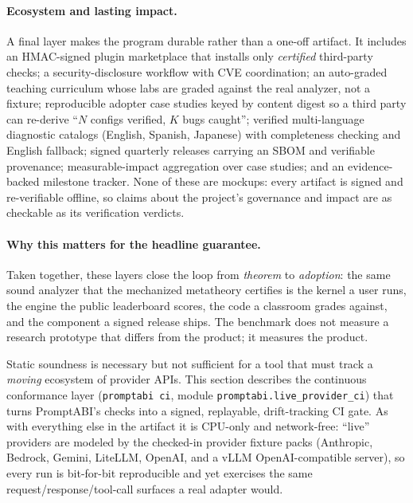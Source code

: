 \documentclass[10pt]{article}
\begin{document}
\paragraph{Ecosystem and lasting impact.}
A final layer makes the program durable rather than a one-off artifact. It
includes an HMAC-signed plugin marketplace that installs only \emph{certified}
third-party checks; a security-disclosure workflow with CVE coordination; an
auto-graded teaching curriculum whose labs are graded against the real analyzer,
not a fixture; reproducible adopter case studies keyed by content digest so a
third party can re-derive ``$N$ configs verified, $K$ bugs caught''; verified
multi-language diagnostic catalogs (English, Spanish, Japanese) with
completeness checking and English fallback; signed quarterly releases carrying an
SBOM and verifiable provenance; measurable-impact aggregation over case studies;
and an evidence-backed milestone tracker. None of these are mockups: every
artifact is signed and re-verifiable offline, so claims about the project's
governance and impact are as checkable as its verification verdicts.

\paragraph{Why this matters for the headline guarantee.}
Taken together, these layers close the loop from \emph{theorem} to \emph{adoption}:
the same sound analyzer that the mechanized metatheory certifies is the kernel a
user runs, the engine the public leaderboard scores, the code a classroom grades
against, and the component a signed release ships. The benchmark does not measure
a research prototype that differs from the product; it measures the product.



\label{sec:live-ci}

Static soundness is necessary but not sufficient for a tool that must track a
\emph{moving} ecosystem of provider APIs. This section describes the continuous
conformance layer (\texttt{promptabi ci}, module
\texttt{promptabi.live\_provider\_ci}) that turns PromptABI's checks into a
signed, replayable, drift-tracking CI gate. As with everything else in the
artifact it is CPU-only and network-free: ``live'' providers are modeled by the
checked-in provider fixture packs (Anthropic, Bedrock, Gemini, LiteLLM, OpenAI,
and a vLLM OpenAI-compatible server), so every run is bit-for-bit reproducible
and yet exercises the same request/response/tool-call surfaces a real adapter
would.
\end{document}

